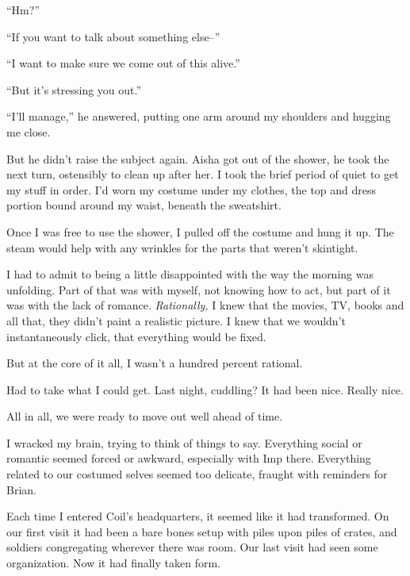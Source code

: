 ``Hm?''



``If you want to talk about something else--''



``I want to make sure we come out of this alive.''



``But it's stressing you out.''



``I'll manage,'' he answered, putting one arm around my shoulders and hugging me close.



But he didn't raise the subject again.  Aisha got out of the shower, he took the next turn, ostensibly to clean up after her.  I took the brief period of quiet to get my stuff in order.  I'd worn my costume under my clothes, the top and dress portion  bound around my waist, beneath the sweatshirt.



Once I was free to use the shower, I pulled off the costume and hung it up.  The steam would help with any wrinkles for the parts that weren't skintight.



I had to admit to being a little disappointed with the way the morning was unfolding.  Part of that was with myself, not knowing how to act, but part of it was with the lack of romance.  \emph{Rationally}\emph{, }I knew that the movies, TV, books and all that, they didn't paint a realistic picture.  I knew that we wouldn't instantaneously click, that everything would be fixed.



But at the core of it all, I wasn't a hundred percent rational.



Had to take what I could get.  Last night, cuddling?  It had been nice.  Really nice.



All in all, we were ready to move out well ahead of time.



I wracked my brain, trying to think of things to say.  Everything social or romantic seemed forced or awkward, especially with Imp there.  Everything related to our costumed selves seemed too delicate, fraught with reminders for Brian.



Each time I entered Coil's headquarters, it seemed like it had transformed.  On our first visit it had been a bare bones setup with piles upon piles of crates, and soldiers congregating wherever there was room.  Our last visit had seen some organization.  Now it had finally taken form.



